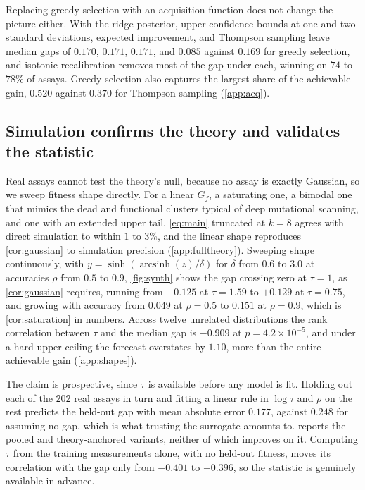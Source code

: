 \documentclass{article}
\theoremstyle{plain}
\theoremstyle{definition}
\begin{document}
Replacing greedy selection with an acquisition function does not change the picture
either. With the ridge posterior, upper confidence bounds at one and two standard
deviations, expected improvement, and Thompson sampling leave median gaps of $0.170$,
$0.171$, $0.171$, and $0.085$ against $0.169$ for greedy selection, and isotonic
recalibration removes most of the gap under each, winning on $74$ to $78\%$ of assays.
Greedy selection also captures the largest share of the achievable gain, $0.520$
against $0.370$ for Thompson sampling (\cref{app:acq}).


\subsection{Simulation confirms the theory and validates the statistic}
\label{sec:results-synth}

Real assays cannot test the theory's null, because no assay is exactly Gaussian, so we
sweep fitness shape directly. For a linear $G_{\!f}$, a saturating one, a bimodal one
that mimics the dead and functional clusters typical of deep mutational scanning, and
one with an extended upper tail, \cref{eq:main} truncated at $k = 8$ agrees with direct
simulation to within $1$ to $3\%$, and the linear shape reproduces \cref{cor:gaussian}
to simulation precision (\cref{app:fulltheory}). Sweeping shape continuously, with $y = \sinh(\operatorname{arcsinh}(z) /
\delta)$ for $\delta$ from $0.6$ to $3.0$ at accuracies $\rho$ from $0.5$ to $0.9$, \cref{fig:synth}
shows the gap crossing zero at $\tau = 1$, as \cref{cor:gaussian}
requires, running from $-0.125$ at $\tau = 1.59$ to $+0.129$ at $\tau = 0.75$, and
growing with accuracy from $0.049$ at $\rho = 0.5$ to $0.151$ at $\rho = 0.9$, which is
\cref{cor:saturation} in numbers. Across twelve unrelated distributions the rank
correlation between $\tau$ and the median gap is $-0.909$ at $p = 4.2 \times 10^{-5}$,
and under a hard upper ceiling the forecast overstates by $1.10$, more than the entire
achievable gain (\cref{app:shapes}).

The claim is prospective, since $\tau$ is available before any model is fit. Holding
out each of the $202$ real assays in turn and fitting a linear rule in $\log \tau$ and
$\rho$ on the rest predicts the held-out gap with mean absolute error $0.177$, against
$0.248$ for assuming no gap, which is what trusting the surrogate amounts to.
 reports the pooled and theory-anchored variants, neither of which
improves on it. Computing $\tau$ from the training measurements alone, with no held-out
fitness, moves its correlation with the gap only from $-0.401$ to $-0.396$, so the
statistic is genuinely available in advance.
\end{document}
